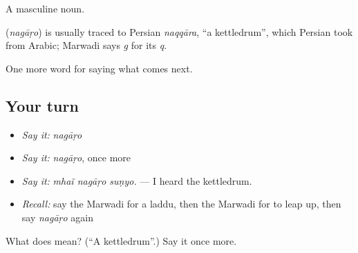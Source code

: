 A masculine noun.

\begin{cousinweb}
\textbf{} (\emph{nagāṛo}) is usually traced to Persian \emph{naqqāra}, \textquotedblleft{}a kettledrum\textquotedblright{}, which Persian took from Arabic; Marwadi says \emph{g} for its \emph{q}.
\end{cousinweb}

\begin{grammarlens}[title={What you've built}]
One more word for saying what comes next.
\end{grammarlens}

\subsection*{Your turn}
\begin{itemize}
\raggedright
  \item \emph{Say it:} \emph{nagāṛo}
  \item \emph{Say it:} \emph{nagāṛo}, once more
  \item \emph{Say it:} \emph{mhaĩ nagāṛo suṇyo.} — I heard the kettledrum.
  \item \emph{Recall:} say the Marwadi for a laddu, then the Marwadi for to leap up, then say \emph{nagāṛo} again
\end{itemize}

\begin{tcolorbox}[breakable,colback=teal!4,colframe=teal!35!black,title={Before you move on}]
What does  mean? (\textquotedblleft{}A kettledrum\textquotedblright{}.) Say it once more.
\end{tcolorbox}
